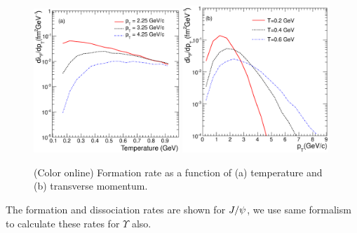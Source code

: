 \documentclass[aps,prc,preprint,superscriptaddress,showpacs,showkeys]{revtex4-1}
\begin{document}
\begin{figure}
\includegraphics[width=0.49\textwidth]{Fig4a_FRateVsT.eps}
\includegraphics[width=0.49\textwidth]{Fig4b_FRateVsPt.eps}
\caption{(Color online) Formation rate as a function of (a) temperature and (b) transverse momentum.}
\label{fig:ForRateVsTempAndPt}
\end{figure}

The formation and dissociation rates are shown for $J/\psi$, we use same formalism to calculate
these rates for $\Upsilon$ also.
\end{document}
